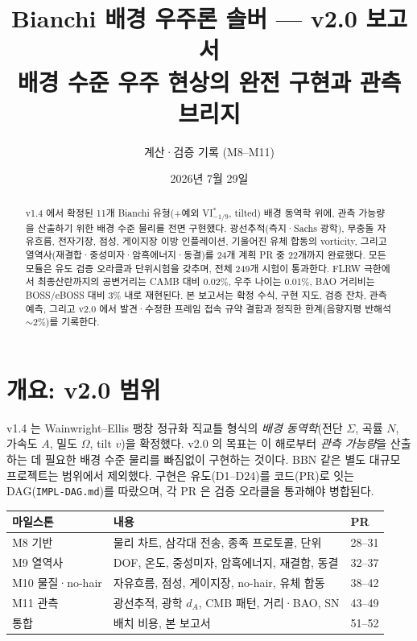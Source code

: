 \documentclass[11pt]{article}
\title{\textbf{Bianchi 배경 우주론 솔버 — v2.0 보고서}\\[0.3em]
\large 배경 수준 우주 현상의 완전 구현과 관측 브리지}
\author{계산·검증 기록 (M8--M11)}
\date{2026년 7월 29일}
\newcommand{\Sig}{\Sigma}
\begin{document}
\maketitle

\begin{abstract}
\noindent
v1.4 에서 확정된 11개 Bianchi 유형(+예외 VI$^*_{-1/9}$, tilted) 배경 동역학 위에,
관측 가능량을 산출하기 위한 배경 수준 물리를 전면 구현했다. 광선추적(측지·Sachs 광학),
무충돌 자유흐름, 전자기장, 점성, 게이지장 이방 인플레이션, 기울어진 유체 합동의
vorticity, 그리고 열역사(재결합·중성미자·암흑에너지·동결)를 24개 계획 PR 중 22개까지
완료했다. 모든 모듈은 유도 검증 오라클과 단위시험을 갖추며, 전체 249개 시험이 통과한다.
FLRW 극한에서 최종산란까지의 공변거리는 CAMB 대비 0.02\%, 우주 나이는 0.01\%,
BAO 거리비는 BOSS/eBOSS 대비 3\% 내로 재현된다. 본 보고서는 확정 수식, 구현 지도,
검증 잔차, 관측 예측, 그리고 v2.0 에서 발견·수정한 프레임 접속 규약 결함과 정직한
한계(음향지평 반해석 $\sim$2\%)를 기록한다.
\end{abstract}

\section{개요: v2.0 범위}

v1.4 는 Wainwright--Ellis 팽창 정규화 직교틀 형식의 \emph{배경 동역학}(전단 $\Sig$,
곡률 $N$, 가속도 $A$, 밀도 $\Omega$, tilt $v$)을 확정했다. v2.0 의 목표는 이 해로부터
\emph{관측 가능량}을 산출하는 데 필요한 배경 수준 물리를 빠짐없이 구현하는 것이다.
BBN 같은 별도 대규모 프로젝트는 범위에서 제외했다. 구현은 유도(D1--D24)를 코드(PR)로
잇는 DAG(\texttt{IMPL-DAG.md})를 따랐으며, 각 PR 은 검증 오라클을 통과해야 병합된다.

\begin{center}
\begin{tabular}{@{}lll@{}}
\toprule
마일스톤 & 내용 & PR \\
\midrule
M8 기반 & 물리 차트, 삼각대 전송, 종족 프로토콜, 단위 & 28--31 \\
M9 열역사 & DOF, 온도, 중성미자, 암흑에너지, 재결합, 동결 & 32--37 \\
M10 물질·no-hair & 자유흐름, 점성, 게이지장, no-hair, 유체 합동 & 38--42 \\
M11 관측 & 광선추적, 광학 $d_A$, CMB 패턴, 거리·BAO, SN & 43--49 \\
통합 & 배치 비용, 본 보고서 & 51--52 \\
\bottomrule
\end{tabular}
\end{center}
\end{document}
